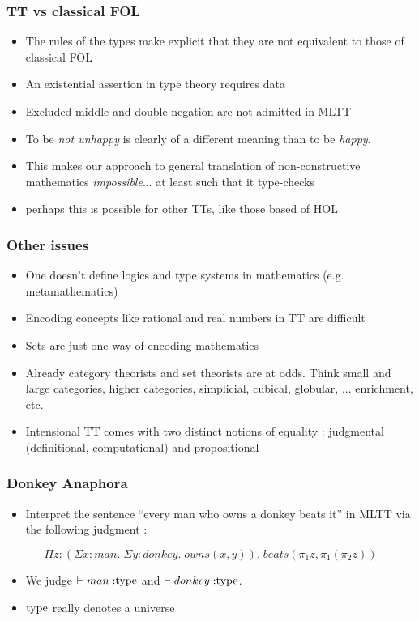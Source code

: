 \documentclass[9pt]{beamer}
\begin{document}
\begin{frame}
\frametitle{TT vs classical FOL}

\begin{itemize}
\item The rules of the types make explicit that they are not equivalent to those
  of classical FOL
\item An existential assertion in type theory requires data
\item Excluded middle and double negation are not admitted in MLTT
\item To be \emph{not unhappy} is clearly of a different meaning than to be \emph{happy}.
\item This makes our approach to general translation of non-constructive
  mathematics \emph{impossible}... at least such that it type-checks 
\item perhaps this is possible for other TTs, like those based of HOL

\end{itemize}
\end{frame}

\begin{frame}
\frametitle{Other issues}
\begin{itemize}
\item One doesn't define logics and type systems in mathematics (e.g. metamathematics)
\item Encoding concepts like rational and real numbers in TT are difficult
\item Sets are just one way of encoding mathematics
\item Already category theorists and set theorists are at odds. Think small and
  large categories, higher categories, {simplicial, cubical, globular, ...}
  enrichment, etc.
\item Intensional TT comes with two distinct notions of
  equality : judgmental (definitional, computational) and propositional
\end{itemize}
\end{frame}

\begin{frame}
\frametitle{Donkey Anaphora}

\begin{itemize}
\item Interpret the sentence ``every man who owns a donkey beats it'' in MLTT via the following judgment :
\end{itemize}

\[\Pi z : (\Sigma x : man. \; \Sigma y : donkey. \; owns(x,y)). \;
  beats(\pi_1z,\pi_1(\pi_2z))\]

\begin{itemize}
\item We judge $\vdash man \; {:} {\rm type}$ and $\vdash donkey \; {:}
{\rm type}$.
\item ${\rm type}$ really denotes a universe
\end{itemize}

\end{frame}
\end{document}
